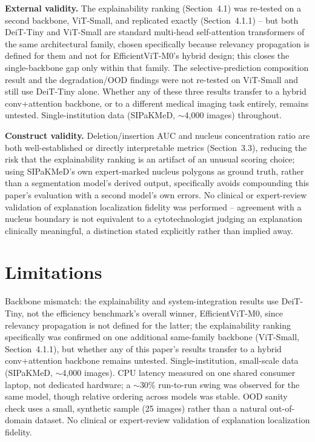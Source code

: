 \documentclass[runningheads]{llncs}
\begin{document}
\textbf{External validity.} The explainability ranking (Section~4.1) was
re-tested on a second backbone, ViT-Small, and replicated exactly
(Section~4.1.1) -- but both DeiT-Tiny and ViT-Small are standard
multi-head self-attention transformers of the same architectural family,
chosen specifically because relevancy propagation is defined for them and
not for EfficientViT-M0's hybrid design; this closes the single-backbone
gap only within that family. The selective-prediction composition result
and the degradation/OOD findings were not re-tested on ViT-Small and
still use DeiT-Tiny alone. Whether any of these three results transfer to
a hybrid conv+attention backbone, or to a different medical imaging task
entirely, remains untested. Single-institution data (SIPaKMeD,
$\sim$4{,}000 images) throughout.

\textbf{Construct validity.} Deletion/insertion AUC and nucleus
concentration ratio are both well-established or directly interpretable
metrics (Section~3.3), reducing the risk that the explainability ranking
is an artifact of an unusual scoring choice; using SIPaKMeD's own
expert-marked nucleus polygons as ground truth, rather than a
segmentation model's derived output, specifically avoids compounding this
paper's evaluation with a second model's own errors. No clinical or
expert-review validation of explanation localization fidelity was
performed -- agreement with a nucleus boundary is not equivalent to a
cytotechnologist judging an explanation clinically meaningful, a
distinction stated explicitly rather than implied away.

\section{Limitations}

Backbone mismatch: the explainability and system-integration results use
DeiT-Tiny, not the efficiency benchmark's overall winner, EfficientViT-M0,
since relevancy propagation is not defined for the latter; the
explainability ranking specifically was confirmed on one additional
same-family backbone (ViT-Small, Section~4.1.1), but whether any of this
paper's results transfer to a hybrid conv+attention backbone remains
untested. Single-institution, small-scale data (SIPaKMeD, $\sim$4{,}000 images). CPU
latency measured on one shared consumer laptop, not dedicated hardware;
a $\sim$30\% run-to-run swing was observed for the same model, though
relative ordering across models was stable. OOD sanity check uses a
small, synthetic sample (25 images) rather than a natural out-of-domain
dataset. No clinical or expert-review validation of explanation
localization fidelity.
\end{document}
